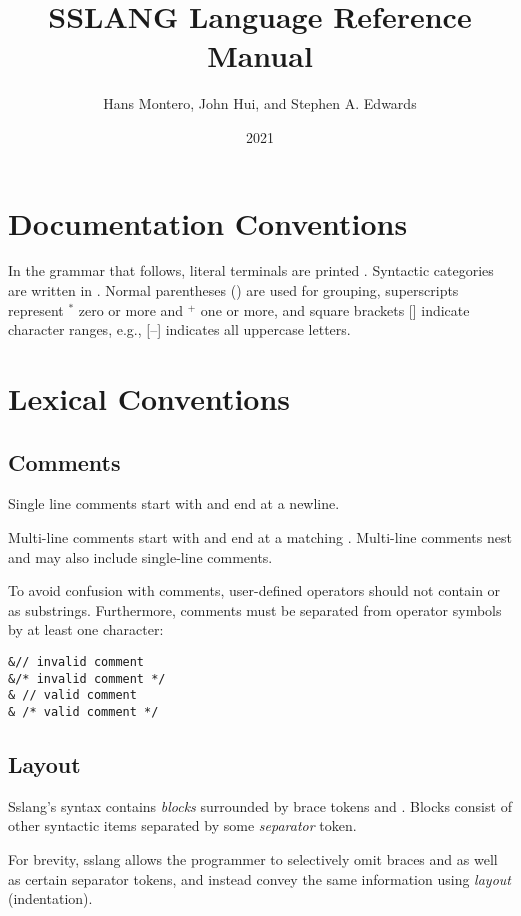 \documentclass{article}
\title{SSLANG Language Reference Manual}
\author{Hans Montero, John Hui, and Stephen A. Edwards}
\date{2021}
\def\<#1>{\synt{#1}}
\begin{document}
\maketitle

\section{Documentation Conventions}

In the grammar that follows, literal terminals are printed .  Syntactic categories are written in \<italics>.
Normal parentheses () are used for grouping, superscripts represent
$^*$ zero or more and $^+$ one or more, and square brackets []
indicate character ranges, e.g., [--] indicates all
uppercase letters.

\section{Lexical Conventions}

\subsection{Comments}

Single line comments start with \lit*{//} and end at a newline.

Multi-line comments start with \lit*{/*} and end at a matching
\lit*{*/}.  Multi-line comments nest and may also include
single-line comments.

To avoid confusion with comments, user-defined operators
should not contain \lit*{//} or \lit*{/*} as substrings.
Furthermore, comments must be separated from operator symbols
by at least one character:

\begin{lstlisting}
&// invalid comment
&/* invalid comment */
& // valid comment
& /* valid comment */
\end{lstlisting}

\subsection{Layout}

Sslang's syntax contains \emph{blocks} surrounded by brace tokens \lit*{\{} and \lit*{\}}.
Blocks consist of other syntactic items separated by some \emph{separator} token.

For brevity, sslang allows the programmer to selectively omit braces \lit*{\{} and \lit*{\}}
as well as certain separator tokens, and instead convey the same information
using \emph{layout} (indentation).
\end{document}
